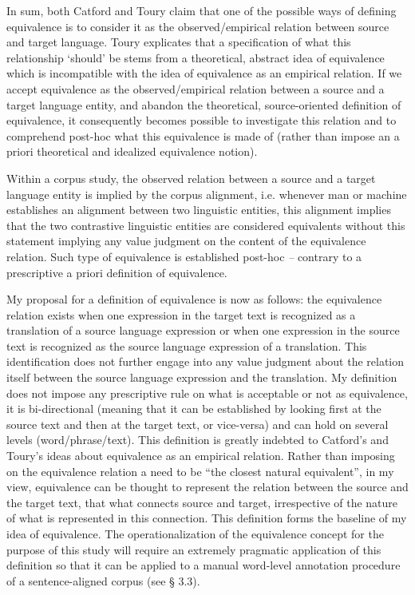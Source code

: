 In sum, both Catford and Toury claim that one of the possible ways of defining equivalence is to consider it as the observed/empirical relation between source and target language. Toury explicates that a specification of what this relationship ‘should’ be stems from a theoretical, abstract idea of equivalence which is incompatible with the idea of equivalence as an empirical relation. If we accept equivalence as the observed/empirical relation between a source and a target language entity, and abandon the theoretical, source-oriented definition of equivalence, it consequently becomes possible to investigate this relation and to comprehend post-hoc what this equivalence is made of (rather than impose an a priori theoretical and idealized equivalence notion).



Within a corpus study, the observed relation between a source and a target language entity is implied by the corpus alignment, i.e. whenever man or machine establishes an alignment between two linguistic entities, this alignment implies that the two contrastive linguistic entities are considered equivalents without this statement implying any value judgment on the content of the equivalence relation. Such type of equivalence is established post-hoc \textit{–} contrary to a prescriptive a priori definition of equivalence.



My proposal for a definition of equivalence is now as follows: the equivalence relation exists when one expression in the target text is recognized as a translation of a source language expression or when one expression in the source text is recognized as the source language expression of a translation. This identification does not further engage into any value judgment about the relation itself between the source language expression and the translation. My definition does not impose any prescriptive rule on what is acceptable or not as equivalence, it is bi-directional (meaning that it can be established by looking first at the source text and then at the target text, or vice-versa) and can hold on several levels (word/phrase/text). This definition is greatly indebted to Catford’s and Toury’s ideas about equivalence as an empirical relation. Rather than imposing on the equivalence relation a need to be “the closest natural equivalent”, in my view, equivalence can be thought to represent the relation between the source and the target text, that what connects source and target, irrespective of the nature of what is represented in this connection. This definition forms the baseline of my idea of equivalence. The operationalization of the equivalence concept for the purpose of this study will require an extremely pragmatic application of this definition so that it can be applied to a manual word-level annotation procedure of a sentence-aligned corpus (see § 3.3).


